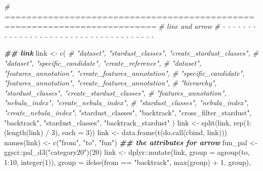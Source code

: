 \documentclass[
]{article}
\newenvironment{Shaded}{\begin{snugshade}}{\end{snugshade}}
\newcommand{\AttributeTok}[1]{\textcolor[rgb]{0.77,0.63,0.00}{#1}}
\newcommand{\CommentTok}[1]{\textcolor[rgb]{0.56,0.35,0.01}{\textit{#1}}}
\newcommand{\DecValTok}[1]{\textcolor[rgb]{0.00,0.00,0.81}{#1}}
\newcommand{\DocumentationTok}[1]{\textcolor[rgb]{0.56,0.35,0.01}{\textbf{\textit{#1}}}}
\newcommand{\FunctionTok}[1]{\textcolor[rgb]{0.00,0.00,0.00}{#1}}
\newcommand{\NormalTok}[1]{#1}
\newcommand{\OtherTok}[1]{\textcolor[rgb]{0.56,0.35,0.01}{#1}}
\newcommand{\SpecialCharTok}[1]{\textcolor[rgb]{0.00,0.00,0.00}{#1}}
\newcommand{\StringTok}[1]{\textcolor[rgb]{0.31,0.60,0.02}{#1}}
\begin{document}
\begin{Shaded}
\begin{Highlighting}[]
\CommentTok{\# ==========================================================================}
\CommentTok{\# line and arrow}
\CommentTok{\# {-} {-} {-} {-} {-} {-} {-} {-} {-} {-} {-} {-} {-} {-} {-} {-} {-} {-} {-} {-} {-} {-} {-} {-} {-} {-} {-} {-} {-} {-} {-} {-} {-} {-} {-} {-} {-}}

\DocumentationTok{\#\# link}
\NormalTok{link }\OtherTok{\textless{}{-}} \FunctionTok{c}\NormalTok{(}
  \CommentTok{\# "dataset", "stardust\_classes", "create\_stardust\_classes",}
  \CommentTok{\# "dataset", "specific\_candidate", "create\_reference",}
  \CommentTok{\# "dataset", "features\_annotation", "create\_features\_annotation",}
  \CommentTok{\# "specific\_candidate", "features\_annotation", "create\_features\_annotation",}
  \CommentTok{\# "hierarchy", "stardust\_classes", "create\_stardust\_classes",}
  \CommentTok{\# "features\_annotation", "nebula\_index", "create\_nebula\_index",}
  \CommentTok{\# "stardust\_classes", "nebula\_index", "create\_nebula\_index",}
  \StringTok{"stardust\_classes"}\NormalTok{, }\StringTok{"backtrack"}\NormalTok{, }\StringTok{"cross\_filter\_stardust"}\NormalTok{,}
  \StringTok{"backtrack"}\NormalTok{, }\StringTok{"stardust\_classes"}\NormalTok{, }\StringTok{"backtrack\_stardust"}
\NormalTok{)}
\NormalTok{link }\OtherTok{\textless{}{-}} \FunctionTok{split}\NormalTok{(link, }\FunctionTok{rep}\NormalTok{(}\DecValTok{1}\SpecialCharTok{:}\NormalTok{(}\FunctionTok{length}\NormalTok{(link) }\SpecialCharTok{/} \DecValTok{3}\NormalTok{), }\AttributeTok{each =} \DecValTok{3}\NormalTok{))}
\NormalTok{link }\OtherTok{\textless{}{-}} \FunctionTok{data.frame}\NormalTok{(}\FunctionTok{t}\NormalTok{(}\FunctionTok{do.call}\NormalTok{(cbind, link)))}
\FunctionTok{names}\NormalTok{(link) }\OtherTok{\textless{}{-}} \FunctionTok{c}\NormalTok{(}\StringTok{"from"}\NormalTok{, }\StringTok{"to"}\NormalTok{, }\StringTok{"fun"}\NormalTok{)}
\DocumentationTok{\#\# the attributes for arrow}
\NormalTok{fun\_pal }\OtherTok{\textless{}{-}}\NormalTok{ ggsci}\SpecialCharTok{::}\FunctionTok{pal\_d3}\NormalTok{(}\StringTok{"category20"}\NormalTok{)(}\DecValTok{20}\NormalTok{)}
\NormalTok{link }\OtherTok{\textless{}{-}}\NormalTok{ dplyr}\SpecialCharTok{::}\FunctionTok{mutate}\NormalTok{(link,}
  \AttributeTok{group =} \FunctionTok{agroup}\NormalTok{(to, }\DecValTok{1}\SpecialCharTok{:}\DecValTok{10}\NormalTok{, }\FunctionTok{integer}\NormalTok{(}\DecValTok{1}\NormalTok{)),}
  \AttributeTok{group =} \FunctionTok{ifelse}\NormalTok{(from }\SpecialCharTok{==} \StringTok{"backtrack"}\NormalTok{, }\FunctionTok{max}\NormalTok{(group) }\SpecialCharTok{+} \DecValTok{1}\NormalTok{, group),}

\end{Highlighting}
\end{Shaded}
\end{document}
